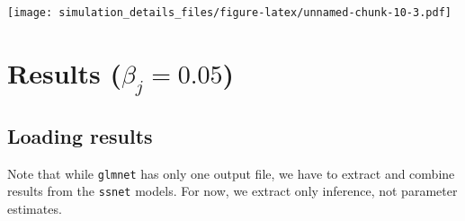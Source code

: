 \documentclass[
]{article}
\begin{document}
\texttt{[image: simulation\_details\_files/figure-latex/unnamed-chunk-10-3.pdf]}

\hypertarget{results-beta_j-0.05}{%
\section{\texorpdfstring{Results
(\(\beta_j = 0.05\))}{Results (\textbackslash beta\_j = 0.05)}}\label{results-beta_j-0.05}}

\hypertarget{loading-results-1}{%
\subsection{Loading results}\label{loading-results-1}}

Note that while \texttt{glmnet} has only one output file, we have to
extract and combine results from the \texttt{ssnet} models. For now, we
extract only inference, not parameter estimates.
\end{document}
